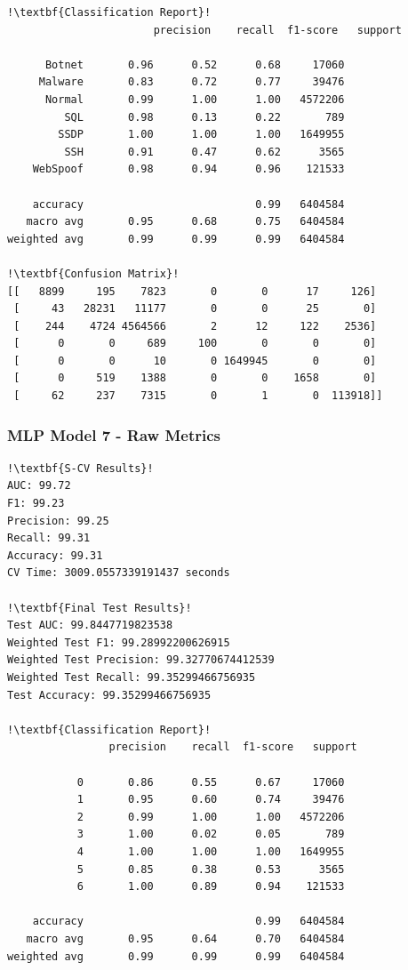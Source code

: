 \begin{appendices}
\begin{lstlisting}[escapechar=!]
!\textbf{Classification Report}!
			           precision    recall  f1-score   support

      Botnet       0.96      0.52      0.68     17060
     Malware       0.83      0.72      0.77     39476
      Normal       0.99      1.00      1.00   4572206
         SQL       0.98      0.13      0.22       789
        SSDP       1.00      1.00      1.00   1649955
         SSH       0.91      0.47      0.62      3565
    WebSpoof       0.98      0.94      0.96    121533

    accuracy                           0.99   6404584
   macro avg       0.95      0.68      0.75   6404584
weighted avg       0.99      0.99      0.99   6404584
    
!\textbf{Confusion Matrix}!    
[[   8899     195    7823       0       0      17     126]
 [     43   28231   11177       0       0      25       0]
 [    244    4724 4564566       2      12     122    2536]
 [      0       0     689     100       0       0       0]
 [      0       0      10       0 1649945       0       0]
 [      0     519    1388       0       0    1658       0]
 [     62     237    7315       0       1       0  113918]]

\end{lstlisting}

\subsubsection{MLP Model 7 - Raw Metrics}
\begin{lstlisting}[escapechar=!]
!\textbf{S-CV Results}!
AUC: 99.72
F1: 99.23
Precision: 99.25
Recall: 99.31
Accuracy: 99.31
CV Time: 3009.0557339191437 seconds

!\textbf{Final Test Results}!
Test AUC: 99.8447719823538
Weighted Test F1: 99.28992200626915
Weighted Test Precision: 99.32770674412539
Weighted Test Recall: 99.35299466756935
Test Accuracy: 99.35299466756935

!\textbf{Classification Report}!
       		    precision    recall  f1-score   support
       		  
           0       0.86      0.55      0.67     17060
           1       0.95      0.60      0.74     39476
           2       0.99      1.00      1.00   4572206
           3       1.00      0.02      0.05       789
           4       1.00      1.00      1.00   1649955
           5       0.85      0.38      0.53      3565
           6       1.00      0.89      0.94    121533

    accuracy                           0.99   6404584
   macro avg       0.95      0.64      0.70   6404584
weighted avg       0.99      0.99      0.99   6404584
    

\end{lstlisting}
\end{appendices}
